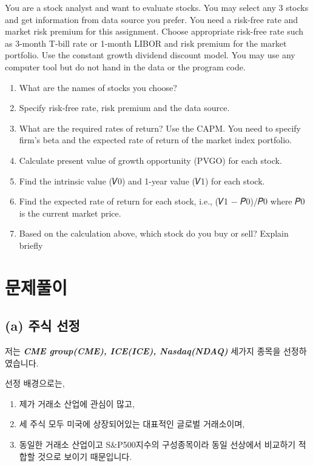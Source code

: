 \documentclass[
  a4paper,
  DIV=11,
  numbers=noendperiod]{scrreprt}
\providecommand{\tightlist}{%
  \setlength{\itemsep}{0pt}\setlength{\parskip}{0pt}}\usepackage{longtable,booktabs,array}
\begin{document}

You are a stock analyst and want to evaluate stocks. You may select any
3 stocks and get information from data source you prefer. You need a
risk-free rate and market risk premium for this assignment. Choose
appropriate risk-free rate such as 3-month T-bill rate or 1-month LIBOR
and risk premium for the market portfolio. Use the constant growth
dividend discount model. You may use any computer tool but do not hand
in the data or the program code.

\begin{enumerate}
\def\labelenumi{\alph{enumi})}
\tightlist
\item
  What are the names of stocks you choose?
\item
  Specify risk-free rate, risk premium and the data source.
\item
  What are the required rates of return? Use the CAPM. You need to
  specify firm's beta and the expected rate of return of the market
  index portfolio.
\item
  Calculate present value of growth opportunity (PVGO) for each stock.
\item
  Find the intrinsic value (𝑉0) and 1-year value (𝑉1) for each stock.
\item
  Find the expected rate of return for each stock, i.e., (𝑉1 − 𝑃0)/𝑃0
  where 𝑃0 is the current market price.
\item
  Based on the calculation above, which stock do you buy or sell?
  Explain briefly
\end{enumerate}

\section*{문제풀이}\label{uxbb38uxc81cuxd480uxc774}


\subsection*{(a) 주식 선정}\label{a-uxc8fcuxc2dd-uxc120uxc815}

저는 \textbf{\emph{CME group(CME), ICE(ICE), Nasdaq(NDAQ)}} 세가지
종목을 선정하였습니다.

선정 배경으로는,

\begin{enumerate}
\def\labelenumi{(\arabic{enumi})}
\tightlist
\item
  제가 거래소 산업에 관심이 많고,
\item
  세 주식 모두 미국에 상장되어있는 대표적인 글로벌 거래소이며,
\item
  동일한 거래소 산업이고 S\&P500지수의 구성종목이라 동일 선상에서
  비교하기 적합할 것으로 보이기 때문입니다.
\end{enumerate}
\end{document}
